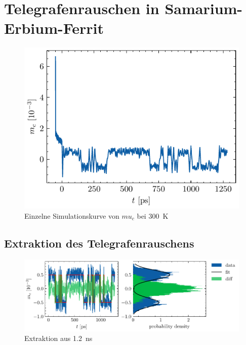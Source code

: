 \documentclass[main.tex]{subfiles}
\begin{document}
\newpage
\section{Telegrafenrauschen in Samarium-Erbium-Ferrit}


\begin{figure}[h]
    \centering
    \includegraphics{bilder/plots/theo-vis/example-telegraph-sim.pdf}
    \caption{Einzelne Simulationskurve von \(mu_c\) bei \SI{300}{\kelvin}}\label{fig:bsp-run}
\end{figure}


\subsection{Extraktion des Telegrafenrauschens}

\begin{figure}[h]
    \centering
    \includegraphics{bilder/plots/Bz_0mT/mc_fit_hist_part2_26.03meV.pdf}
    \caption{Extraktion aus \SI{1,2}{\nano\s}}\label{fig:Extraktion-ausschnitt}
\end{figure}
\end{document}
